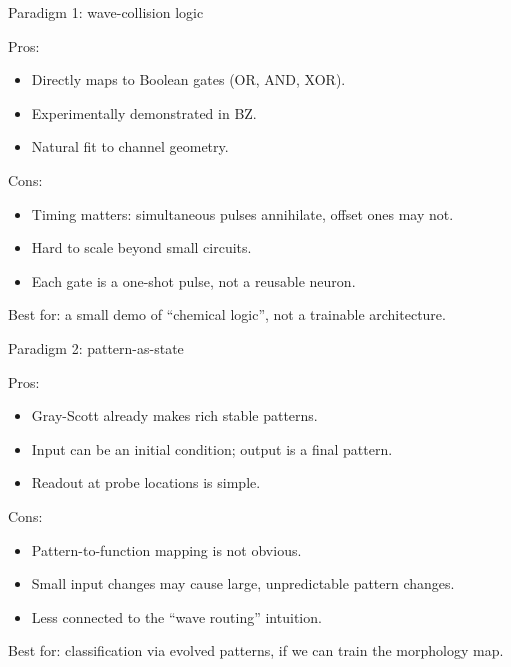\documentclass[aspectratio=169,11pt]{beamer}
\begin{document}
\begin{frame}{Paradigm 1: wave-collision logic}

Pros:
\begin{itemize}
    \item Directly maps to Boolean gates (OR, AND, XOR).
    \item Experimentally demonstrated in BZ.
    \item Natural fit to channel geometry.
\end{itemize}

Cons:
\begin{itemize}
    \item Timing matters: simultaneous pulses annihilate, offset ones may not.
    \item Hard to scale beyond small circuits.
    \item Each gate is a one-shot pulse, not a reusable neuron.
\end{itemize}

\vspace{0.3cm}
\centering
Best for: a small demo of ``chemical logic'', not a trainable architecture.

\end{frame}

\begin{frame}{Paradigm 2: pattern-as-state}

Pros:
\begin{itemize}
    \item Gray-Scott already makes rich stable patterns.
    \item Input can be an initial condition; output is a final pattern.
    \item Readout at probe locations is simple.
\end{itemize}

Cons:
\begin{itemize}
    \item Pattern-to-function mapping is not obvious.
    \item Small input changes may cause large, unpredictable pattern changes.
    \item Less connected to the ``wave routing'' intuition.
\end{itemize}

\vspace{0.3cm}
\centering
Best for: classification via evolved patterns, if we can train the morphology map.

\end{frame}
\end{document}
